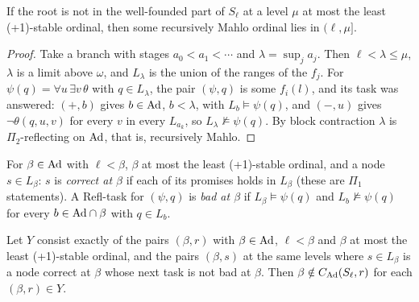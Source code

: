 \documentclass[11pt]{article}
\begin{document}
\begin{statement} If the root is not in the well-founded part of $S_\ell$ at a level $\mu$
at most the least (+1)-stable ordinal, then some recursively Mahlo ordinal lies in $(\ell, \mu]$.
\end{statement}

\begin{proof}
Take a branch with stages $a_0 < a_1 < \cdots$ and $\lambda = \sup_j a_j$. Then $\ell < \lambda \le \mu$, $\lambda$ is
a limit above $\omega$, and $L_\lambda$ is the union of the ranges of the $f_j$. For $\psi(q) = \forall u\, \exists v\,
\theta$ with $q \in L_\lambda$, the pair $(\psi, q)$ is some $f_i(l)$, and its task was answered: $(+, b)$ gives
$b \in \mathrm{Ad}$, $b < \lambda$, with $L_b \models \psi(q)$, and $(-, u)$ gives $\neg\theta(q,u,v)$ for every $v$ in every
$L_{a_k}$, so $L_\lambda \nvDash \psi(q)$. By block contraction $\lambda$ is $\Pi_2$-reflecting on $\mathrm{Ad}$, that is,
recursively Mahlo.
\end{proof}

For $\beta \in \mathrm{Ad}$ with $\ell < \beta$, $\beta$ at most the least (+1)-stable ordinal, and a node $s \in L_\beta$: $s$ is \emph{correct at $\beta$} if
each of its promises holds in $L_\beta$ (these are $\Pi_1$ statements). A Refl-task for $(\psi, q)$ is \emph{bad at
$\beta$} if $L_\beta \models \psi(q)$ and $L_b \nvDash \psi(q)$ for every $b \in \mathrm{Ad} \cap \beta$ with $q \in L_b$.

\begin{statement} Let $Y$ consist exactly of the pairs $(\beta, r)$ with
$\beta \in \mathrm{Ad}$, $\ell < \beta$ and $\beta$ at most the least (+1)-stable ordinal, and the pairs $(\beta, s)$ at the same levels where $s \in L_\beta$ is
a node correct at $\beta$ whose next task is not bad at $\beta$. Then $\beta \notin C_{\mathrm{Ad}}(S_\ell, r)$ for each $(\beta,
r) \in Y$.
\end{statement}
\end{document}
